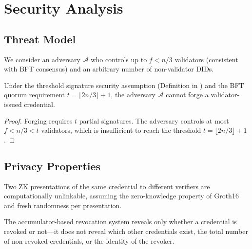 \section{Security Analysis}


\subsection{Threat Model}

We consider an adversary $\mathcal{A}$ who controls up to $f < n/3$ validators (consistent with BFT consensus) and an arbitrary number of non-validator DIDs.

\begin{theorem}
Under the threshold signature security assumption (Definition in \cite{zoo-threshold-signatures}) and the BFT quorum requirement $t = \lfloor 2n/3 \rfloor + 1$, the adversary $\mathcal{A}$ cannot forge a validator-issued credential.
\end{theorem}

\begin{proof}
Forging requires $t$ partial signatures. The adversary controls at most $f < n/3 < t$ validators, which is insufficient to reach the threshold $t = \lfloor 2n/3 \rfloor + 1$.
\end{proof}

\subsection{Privacy Properties}

\begin{proposition}
Two ZK presentations of the same credential to different verifiers are computationally unlinkable, assuming the zero-knowledge property of Groth16 and fresh randomness per presentation.
\end{proposition}

The accumulator-based revocation system reveals only whether a credential is revoked or not---it does not reveal which other credentials exist, the total number of non-revoked credentials, or the identity of the revoker.

